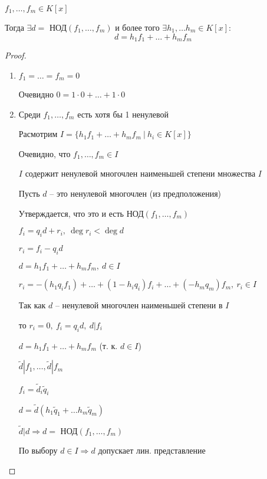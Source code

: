     \begin{theorem*}
        $f_1, \dots, f_m \in K[x]$
        \par \quad Тогда $\exists d = $ НОД$(f_1, \dots, f_m)$ и более того $\exists h_1, \dots h_m \in K[x]$:
        \[
            d = h_1 f_1 + \dots + h_m f_m    
        \]
    \end{theorem*}

    \begin{proof}
        $ $
        \begin{enumerate}
            \item $f_1 = \dots = f_m = 0$
                \par Очевидно $0 = 1 \cdot 0 + \dots + 1 \cdot 0$
            \item Среди $f_1, \dots, f_m$ есть хотя бы 1 ненулевой
                \par Расмотрим $I = \{h_1 f_1 + \dots + h_m f_m \ | \ h_i \in K[x]\}$
                \par Очевидно, что $f_1, \dots, f_m \in I$
                \par $I$ содержит ненулевой многочлен наименьшей степени множества $I$
                \par Пусть $d$ -- это ненулевой многочлен (из предположения)
                \par Утверждается, что это и есть НОД$(f_1, \dots, f_m)$
                \par $f_i = q_i d + r_i, \ \deg r_i < \deg d$
                \par $r_i = f_i - q_i d$
                \par $d = h_1 f_1 + \dots + h_m f_m, \ d \in I$
                \par $r_i = -(h_1 q_i f_1) + \dots + (1 - h_i q_i) f_i + \dots + (-h_m q_m) f_m, \ r_i \in I$ %
                \par Так как $d$ -- ненулевой многочлен наименьшей степени в $I$
                \par то $r_i = 0, \ f_i = q_i d, \ d | f_i$
                \par $d = h_1 f_1 + \dots + h_m f_m$ \quad (т. к. $d \in I$)
                \par $\tilde d | f_1, \dots, \tilde d | f_m$
                \par $f_i = \tilde d_i \tilde q_i$
                \par $d = \tilde d (h_1 \tilde q_1 + \dots h_m \tilde q_m)$
                \par $\tilde d | d \Rightarrow d = $ НОД$(f_1, \dots, f_m)$
                \par По выбору $d \in I \Rightarrow d$ допускает лин. представление
        \end{enumerate}
    \end{proof}

